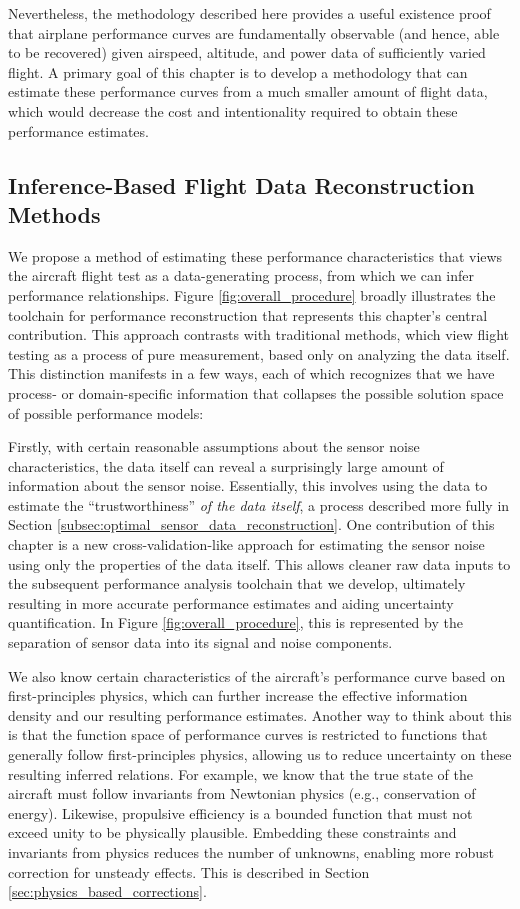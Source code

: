 Nevertheless, the methodology described here provides a useful existence proof that airplane performance curves are fundamentally observable (and hence, able to be recovered) given airspeed, altitude, and power data of sufficiently varied flight. A primary goal of this chapter is to develop a methodology that can estimate these performance curves from a much smaller amount of flight data, which would decrease the cost and intentionality required to obtain these performance estimates.

\subsection{Inference-Based Flight Data Reconstruction Methods}

We propose a method of estimating these performance characteristics that views the aircraft flight test as a data-generating process, from which we can infer performance relationships. Figure \ref{fig:overall_procedure} broadly illustrates the toolchain for performance reconstruction that represents this chapter's central contribution. This approach contrasts with traditional methods, which view flight testing as a process of pure measurement, based only on analyzing the data itself. This distinction manifests in a few ways, each of which recognizes that we have process- or domain-specific information that collapses the possible solution space of possible performance models:

Firstly, with certain reasonable assumptions about the sensor noise characteristics, the data itself can reveal a surprisingly large amount of information about the sensor noise. Essentially, this involves using the data to estimate the ``trustworthiness'' \emph{of the data itself}, a process described more fully in Section \ref{subsec:optimal_sensor_data_reconstruction}. One contribution of this chapter is a new cross-validation-like approach for estimating the sensor noise using only the properties of the data itself. This allows cleaner raw data inputs to the subsequent performance analysis toolchain that we develop, ultimately resulting in more accurate performance estimates and aiding uncertainty quantification. In Figure \ref{fig:overall_procedure}, this is represented by the separation of sensor data into its signal and noise components.

We also know certain characteristics of the aircraft's performance curve based on first-principles physics, which can further increase the effective information density and our resulting performance estimates. Another way to think about this is that the function space of performance curves is restricted to functions that generally follow first-principles physics, allowing us to reduce uncertainty on these resulting inferred relations. For example, we know that the true state of the aircraft must follow invariants from Newtonian physics (e.g., conservation of energy). Likewise, propulsive efficiency is a bounded function that must not exceed unity to be physically plausible. Embedding these constraints and invariants from physics reduces the number of unknowns, enabling more robust correction for unsteady effects. This is described in Section \ref{sec:physics_based_corrections}.

